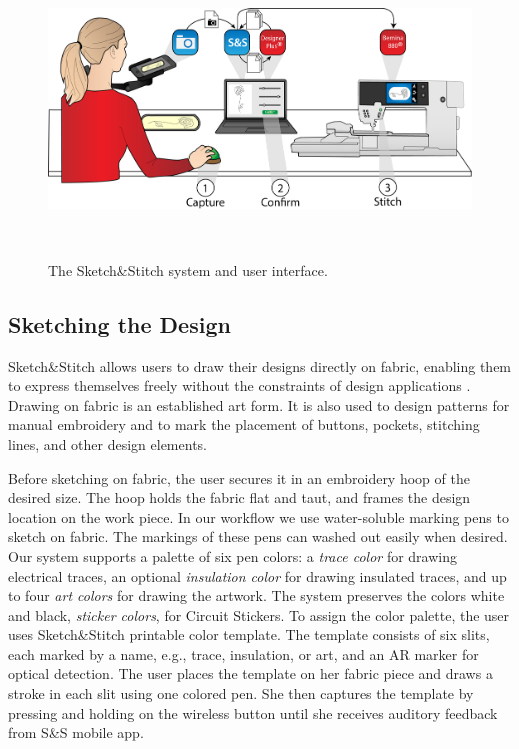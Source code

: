 \documentclass[header.tex]{subfiles}
\begin{document}
\begin{figure}
\centering
  \includegraphics[width=1\columnwidth]{figures/UI.png}
  \caption{The Sketch\&Stitch system and user interface.}~\label{fig:UI}
  \vspace{-1.5em}
\end{figure}


\subsection{Sketching the Design}

Sketch\&Stitch allows users to draw their designs directly on fabric, enabling them to express themselves freely without the constraints of design applications \cite{landay1995interactive,schweikardt2000digital}. Drawing on fabric is an established art form. It is also used to design patterns for manual embroidery and to mark the placement of buttons, pockets, stitching lines, and other design elements. 

Before sketching on fabric, the user secures it in an embroidery hoop of the desired size. The hoop holds the fabric flat and taut, and frames the design location on the work piece. In our workflow we use water-soluble marking pens to sketch on fabric. The markings of these pens can washed out easily when desired. Our system supports a palette of six pen colors: a \textit{trace color} for drawing electrical traces, an optional \textit{insulation color} for drawing insulated traces, and up to four \textit{art colors} for drawing the artwork. The system preserves the colors white and black, \textit{sticker colors}, for Circuit Stickers. 
To assign the color palette, the user uses Sketch\&Stitch printable color template. The template consists of six slits, each marked by a name, e.g., trace, insulation, or art, and an AR marker for optical detection. The user places the template on her fabric piece and draws a stroke in each slit using one colored pen. She then captures the template by pressing and holding on the wireless button until she receives auditory feedback from S&S mobile app. %
\end{document}
